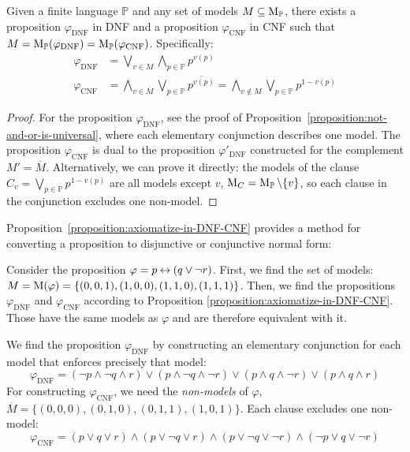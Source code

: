 \begin{proposition} \label{proposition:axiomatize-in-DNF-CNF}
    Given a finite language $\mathbb{P}$ and any set of models $M \subseteq \operatorname{M}_\mathbb{P}$, there exists a proposition $\varphi_{\mathrm{DNF}}$ in DNF and a proposition $\varphi_{\mathrm{CNF}}$ in CNF such that $M = \operatorname{M}_\mathbb{P}(\varphi_{\mathrm{DNF}}) = \operatorname{M}_\mathbb{P}(\varphi_{\mathrm{CNF}})$. Specifically:
\begin{align*}
    \varphi_{\mathrm{\mathrm{DNF}}} &= \bigvee_{v \in M} \bigwedge_{p \in \mathbb{P}} p^{v(p)} \\
    \varphi_{\mathrm{CNF}} &= \bigwedge_{v \in \overline{M}} \bigvee_{p \in \mathbb{P}} \overline{p^{v(p)}} = \bigwedge_{v \notin M} \bigvee_{p \in \mathbb{P}} p^{1-v(p)}
\end{align*}
\end{proposition}

\begin{proof}
    For the proposition $\varphi_{\mathrm{DNF}}$, see the proof of Proposition~\ref{proposition:not-and-or-is-universal}, where each elementary conjunction describes one model. The proposition $\varphi_{\mathrm{CNF}}$ is dual to the proposition $\varphi'_{\mathrm{DNF}}$ constructed for the complement $M' = \overline{M}$. Alternatively, we can prove it directly: the models of the clause $C_v = \bigvee_{p \in \mathbb{P}} p^{1-v(p)}$ are all models except $v$, $\operatorname{M}_C = \operatorname{M}_\mathbb{P} \setminus \{v\}$, so each clause in the conjunction excludes one non-model.
\end{proof}

Proposition~\ref{proposition:axiomatize-in-DNF-CNF} provides a method for converting a proposition to disjunctive or conjunctive normal form:

\begin{example}
    Consider the proposition $\varphi = p \mathbin{\leftrightarrow} (q \lor \neg r)$. First, we find the set of models: $M = \operatorname{M}(\varphi) = \{(0,0,1),(1,0,0),(1,1,0),(1,1,1)\}$. Then, we find the propositions $\varphi_{\mathrm{DNF}}$ and $\varphi_{\mathrm{CNF}}$ according to Proposition \ref{proposition:axiomatize-in-DNF-CNF}. Those have the same models as $\varphi$ and are therefore equivalent with it.

    We find the proposition $\varphi_{\mathrm{DNF}}$ by constructing an elementary conjunction for each model that enforces precisely that model:
    $$
    \varphi_{\mathrm{DNF}} = (\neg p \land \neg q \land r) \lor (p \land \neg q \land \neg r) \lor (p \land q \land \neg r) \lor (p \land q \land r)
    $$
    For constructing $\varphi_{\mathrm{CNF}}$, we need the \emph{non-models} of $\varphi$, $\overline{M} = \{(0,0,0),(0,1,0),(0,1,1),(1,0,1)\}$. Each clause excludes one non-model:
    $$
    \varphi_{\mathrm{CNF}} = (p \lor q \lor r) \land (p \lor \neg q \lor r) \land (p \lor \neg q \lor \neg r) \land (\neg p \lor q \lor \neg r)
    $$   
\end{example}

